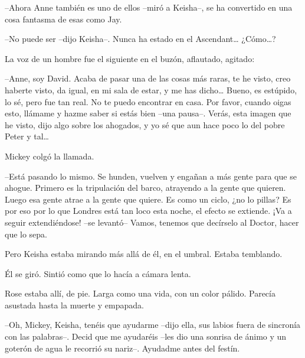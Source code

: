 {--Ahora Anne también es uno de ellos --miró a Keisha--, se ha
convertido en una cosa fantasma de esas como Jay.}

{--No puede ser --dijo Keisha--. Nunca ha estado en el Ascendant\ldots{}
 ¿Cómo\ldots{}?}

{La voz de un hombre fue el siguiente en el buzón, aflautado, agitado:}

{--Anne, soy David. Acaba de pasar una de las cosas más raras, te he
 visto, creo haberte visto, da igual, en mi sala de estar, y me has
 dicho\ldots{} Bueno, es estúpido, lo sé, pero fue tan real. No te puedo
 encontrar en casa. Por favor, cuando oigas esto, llámame y hazme saber
 si estás bien --una pausa--. Verás, esta imagen que he visto, dijo algo
 sobre los ahogados, y yo sé que aun hace poco lo del pobre Peter y
 tal\ldots{}}

{Mickey colgó la llamada.}

{--Está pasando lo mismo. Se hunden, vuelven y engañan a más gente para
 que se ahogue. Primero es la tripulación del barco, atrayendo a la gente
 que quieren. Luego esa gente atrae a la gente que quiere. Es como un
 ciclo, ¿no lo pillas? Es por eso por lo que Londres está tan loco esta
 noche, el efecto se extiende. ¡Va a seguir extendiéndose! --se levantó--
Vamos, tenemos que decírselo al Doctor, hacer que lo sepa.}

{Pero Keisha estaba mirando más allá de él, en el umbral. Estaba
temblando.}

{Él se giró. Sintió como que lo hacía a cámara lenta.}

{Rose estaba allí, de pie. Larga como una vida, con un color pálido.
Parecía asustada hasta la muerte y empapada.}

{--Oh, Mickey, Keisha, tenéis que ayudarme --dijo ella, sus labios fuera
 de sincronía con las palabras--. Decid que me ayudaréis --les dio una
 sonrisa de ánimo y un goterón de agua le recorrió su nariz--. Ayudadme
antes del festín.}
